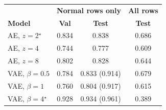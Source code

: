\begin{tabular}{lccc}
\hline
& \multicolumn{2}{c}{\textbf{Normal rows only}} & \textbf{All rows} \\
\textbf{Model} & \textbf{Val} & \textbf{Test} & \textbf{Test} \\ \hline
AE, $z=2$$^\star$ & 0.834 & 0.838 & 0.686 \\
AE, $z=4$ & 0.744 & 0.777 & 0.609 \\
AE, $z=8$ & 0.802 & 0.828 & 0.644 \\
\hline
VAE, $\beta=0.5$ & 0.784 & 0.833 (0.914) & 0.679 \\
VAE, $\beta=1$ & 0.760 & 0.804 (0.917) & 0.615 \\
VAE, $\beta=4$$^\star$ & 0.928 & 0.934 (0.961) & 0.389 \\
\hline
\end{tabular}
